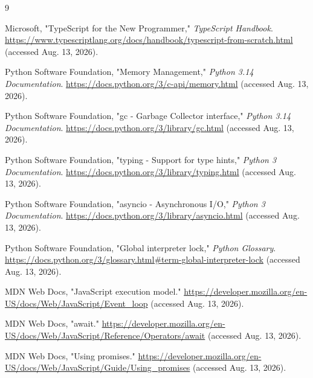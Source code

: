 \documentclass[12pt]{article}
\begin{document}
\begin{thebibliography}{9}

 Microsoft, "TypeScript for the New Programmer," \emph{TypeScript Handbook}. \url{https://www.typescriptlang.org/docs/handbook/typescript-from-scratch.html} (accessed Aug. 13, 2026).

 Python Software Foundation, "Memory Management," \emph{Python 3.14 Documentation}. \url{https://docs.python.org/3/c-api/memory.html} (accessed Aug. 13, 2026).

 Python Software Foundation, "gc - Garbage Collector interface," \emph{Python 3.14 Documentation}. \url{https://docs.python.org/3/library/gc.html} (accessed Aug. 13, 2026).

 Python Software Foundation, "typing - Support for type hints," \emph{Python 3 Documentation}. \url{https://docs.python.org/3/library/typing.html} (accessed Aug. 13, 2026).

 Python Software Foundation, "asyncio - Asynchronous I/O," \emph{Python 3 Documentation}. \url{https://docs.python.org/3/library/asyncio.html} (accessed Aug. 13, 2026).

 Python Software Foundation, "Global interpreter lock," \emph{Python Glossary}. \url{https://docs.python.org/3/glossary.html#term-global-interpreter-lock} (accessed Aug. 13, 2026).

 MDN Web Docs, "JavaScript execution model." \url{https://developer.mozilla.org/en-US/docs/Web/JavaScript/Event_loop} (accessed Aug. 13, 2026).

 MDN Web Docs, "await." \url{https://developer.mozilla.org/en-US/docs/Web/JavaScript/Reference/Operators/await} (accessed Aug. 13, 2026).

 MDN Web Docs, "Using promises." \url{https://developer.mozilla.org/en-US/docs/Web/JavaScript/Guide/Using_promises} (accessed Aug. 13, 2026).

\end{thebibliography}
\end{document}

